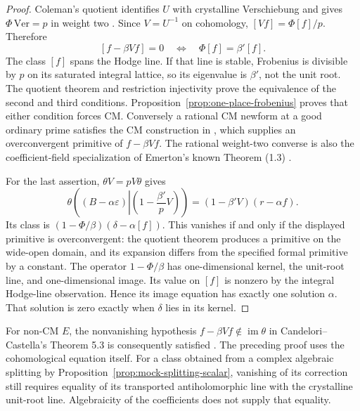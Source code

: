 \documentclass[11pt]{article}
\theoremstyle{definition}\newtheorem{definition}[theorem]{Definition}
\theoremstyle{remark}\newtheorem{remark}[theorem]{Remark}
\begin{document}
\begin{proof}
Coleman's quotient identifies $U$ with crystalline Verschiebung and gives
$\Phi\,\mathrm{Ver}=p$ in weight two \cite[Theorems 5.1 and 5.4, pp.~223 and 225]{Coleman}. Since $V=U^{-1}$ on cohomology, $[Vf]=\Phi[f]/p$. Therefore
\[
 [f-\beta Vf]=0\quad\Longleftrightarrow\quad\Phi[f]=\beta'[f].
\]
The class $[f]$ spans the Hodge line. If that line is stable, Frobenius is divisible by $p$ on its saturated integral lattice, so its eigenvalue is $\beta'$, not the unit root. The quotient theorem and restriction injectivity prove the equivalence of the second and third conditions. Proposition~\ref{prop:one-place-frobenius} proves that either condition forces CM. Conversely a rational CM newform at a good ordinary prime satisfies the CM construction in \cite[Proposition 7.1, p.~231]{Coleman}, which supplies an overconvergent primitive of $f-\beta Vf$. The rational weight-two converse is also the coefficient-field specialization of Emerton's known Theorem (1.3) \cite[pp.~3--4]{EmertonCM}.

For the last assertion, $\theta V=pV\theta$ gives
\[
 \theta\left((B-\alpha\varepsilon)\left|\left(1-\frac{\beta'}pV\right)\right.\right)
                      =(1-\beta' V)(r-\alpha f).
\]
Its class is $(1-\Phi/\beta)(\delta-\alpha[f])$. This vanishes if and only if the displayed primitive is overconvergent: the quotient theorem produces a primitive on the wide-open domain, and its expansion differs from the specified formal primitive by a constant. The operator $1-\Phi/\beta$ has one-dimensional kernel, the unit-root line, and one-dimensional image. Its value on $[f]$ is nonzero by the integral Hodge-line observation. Hence its image equation has exactly one solution $\alpha$. That solution is zero exactly when $\delta$ lies in its kernel.
\end{proof}

For non-CM $E$, the nonvanishing hypothesis $f-\beta Vf\notin\operatorname{im}\theta$ in Candelori--Castella's Theorem 5.3 is consequently satisfied \cite[p.~11]{CandeloriCastella}. The preceding proof uses the cohomological equation itself. For a class obtained from a complex algebraic splitting by Proposition~\ref{prop:mock-splitting-scalar}, vanishing of its correction still requires equality of its transported antiholomorphic line with the crystalline unit-root line. Algebraicity of the coefficients does not supply that equality.
\end{document}
